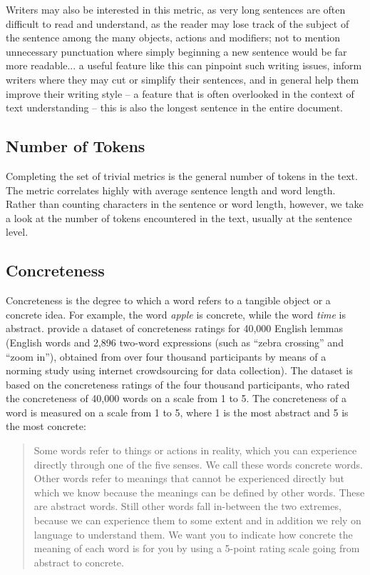 Writers may also be interested in this metric, as very long sentences are often difficult to read and understand, as the reader may lose track of the subject of the sentence among the many objects, actions and modifiers; not to mention unnecessary punctuation where simply beginning a new sentence would be far more readable... a useful feature like this can pinpoint such writing issues, inform writers where they may cut or simplify their sentences, and in general help them improve their writing style -- a feature that is often overlooked in the context of text understanding -- this is also the longest sentence in the entire document.

\subsection{Number of Tokens}
Completing the set of trivial metrics is the general number of tokens in the text. The metric correlates highly with average sentence length and word length. Rather than counting characters in the sentence or word length, however, we take a look at the number of tokens encountered in the text, usually at the sentence level. 

\subsection{Concreteness}
\label{concreteness}
Concreteness is the degree to which a word refers to a tangible object or a concrete idea. For example, the word \textit{apple} is concrete, while the word \textit{time} is abstract. \cite{brysbaert2014concreteness} provide a dataset of concreteness ratings for 40,000 English lemmas (English words and 2,896 two-word expressions (such as ``zebra crossing'' and ``zoom in''), obtained from over four thousand participants by means of a norming study using internet crowdsourcing for data collection). The dataset is based on the concreteness ratings of the four thousand participants, who rated the concreteness of 40,000 words on a scale from 1 to 5.
The concreteness of a word is measured on a scale from 1 to 5, where 1 is the most abstract and 5 is the most concrete: 

\begin{quote}
    Some words refer to things or actions in reality, which you can experience directly through one of the five senses. We call these words concrete words. Other words refer to meanings that cannot be experienced directly but which we know because the meanings can be defined by other words. These are abstract words. Still other words fall in-between the two extremes, because we can experience them to some extent and in addition we rely on language to understand them. We want you to indicate how concrete the meaning of each word is for you by using a 5-point rating scale going from abstract to concrete.
\end{quote}

